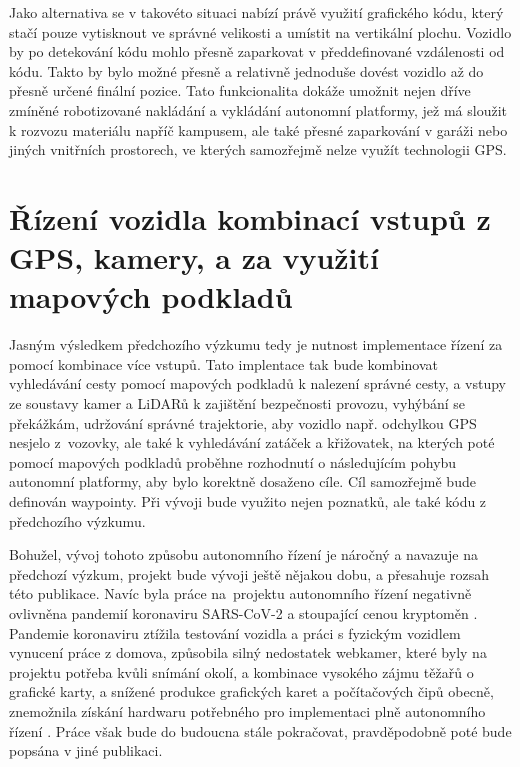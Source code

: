 \documentclass[czech, bachelor]{diploma}
\begin{document}
Jako alternativa se v takovéto situaci nabízí právě využití grafického kódu, který stačí pouze vytisknout ve správné velikosti
a umístit na vertikální plochu. Vozidlo by po detekování kódu mohlo přesně zaparkovat v předdefinované vzdálenosti od kódu. Takto
by bylo možné přesně a relativně jednoduše dovést vozidlo až do přesně určené finální pozice. Tato funkcionalita dokáže umožnit
nejen dříve zmíněné robotizované nakládání a vykládání autonomní platformy, jež má sloužit k rozvozu materiálu napříč kampusem,
ale také přesné zaparkování v garáži nebo jiných vnitřních prostorech, ve kterých samozřejmě nelze využít technologii GPS.

\section{Řízení vozidla kombinací vstupů z GPS, kamery, a za využití mapových podkladů} \label{combination-of-driving-inputs}

Jasným výsledkem předchozího výzkumu tedy je nutnost implementace řízení za pomocí kombinace více vstupů. Tato implentace tak bude
kombinovat vyhledávání cesty pomocí mapových podkladů k nalezení správné cesty, a vstupy ze soustavy kamer a LiDARů k zajištění
bezpečnosti provozu, vyhýbání se překážkám, udržování správné trajektorie, aby vozidlo např. odchylkou GPS nesjelo z~vozovky,
ale také k vyhledávání zatáček a křižovatek, na kterých poté pomocí mapových podkladů proběhne rozhodnutí o následujícím pohybu
autonomní platformy, aby bylo korektně dosaženo cíle. Cíl samozřejmě bude definován waypointy. Při vývoji bude využito nejen
poznatků, ale také kódu z předchozího výzkumu.

Bohužel, vývoj tohoto způsobu autonomního řízení je náročný a navazuje na předchozí výzkum, projekt bude vývoji ještě nějakou
dobu, a přesahuje rozsah této publikace. Navíc byla práce na~projektu autonomního řízení negativně ovlivněna pandemií koronaviru
SARS-CoV-2 \cite{pandemic-source} a stoupající cenou kryptoměn \cite{bitcoin-rally-source}. Pandemie koronaviru ztížila testování
vozidla a práci s fyzickým vozidlem vynucení práce z domova, způsobila silný nedostatek webkamer, které byly na projektu potřeba
kvůli snímání okolí, a kombinace vysokého zájmu těžařů o grafické karty, a snížené produkce grafických karet a počítačových čipů
obecně, znemožnila získání hardwaru potřebného pro implementaci plně autonomního řízení
\cite{bitcoin-miners-gpu-source,webcam-shortage-source}. Práce však bude do budoucna stále pokračovat, pravděpodobně poté bude
popsána v jiné publikaci.
\end{document}
